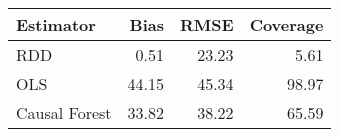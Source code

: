 \begin{table}[ht]
\centering
\begin{tabular}{lrrr}
  \hline
Estimator & Bias & RMSE & Coverage \\ 
  \hline
RDD & 0.51 & 23.23 & 5.61 \\ 
  OLS & 44.15 & 45.34 & 98.97 \\ 
  Causal Forest & 33.82 & 38.22 & 65.59 \\ 
   \hline
\end{tabular}
\end{table}
